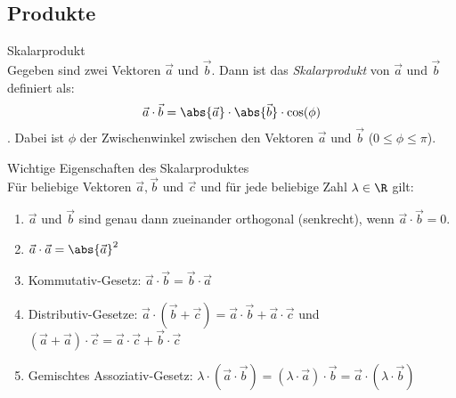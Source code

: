 \subsection{Produkte}
    \begin{definition}{Skalarprodukt}\\
        Gegeben sind zwei Vektoren $\vec{a}$ und $\vec{b}$. 
        Dann ist das \textit{Skalarprodukt} von $\vec{a}$ und $\vec{b}$ definiert als:
        \begin{equation*}
            \vec{a}\cdot\vec{b}=\abs{\vec{a}}\cdot\abs{\vec{b}}\cdot\cos(\phi)
        \end{equation*}. 
        Dabei ist $\phi$ der Zwischenwinkel zwischen den Vektoren $\vec{a}$ und $\vec{b}$ ($0\le\phi\le\pi$).
    \end{definition}

    \begin{theorem}{Wichtige Eigenschaften des Skalarproduktes}\\
        Für beliebige Vektoren $\vec{a}, \vec{b}$ und $\vec{c}$ und für jede beliebige Zahl $\lambda\in\R$ gilt:
        \begin{enumerate}
            \item $\vec{a}$ und $\vec{b}$ sind genau dann zueinander orthogonal (senkrecht), wenn $\vec{a}\cdot\vec{b}=0$.
            \item $\vec{a}\cdot\vec{a}=\abs{\vec{a}}^2$
            \item Kommutativ-Gesetz: $\vec{a}\cdot\vec{b}=\vec{b}\cdot\vec{a}$
            \item Distributiv-Gesetze: $\vec{a}\cdot(\vec{b}+\vec{c})=\vec{a}\cdot\vec{b}+\vec{a}\cdot\vec{c}$ und $(\vec{a}+\vec{a})\cdot\vec{c}=\vec{a}\cdot\vec{c}+\vec{b}\cdot\vec{c}$
            \item Gemischtes Assoziativ-Gesetz: $\lambda\cdot(\vec{a}\cdot\vec{b})=(\lambda\cdot\vec{a})\cdot\vec{b}=\vec{a}\cdot(\lambda\cdot\vec{b})$
        \end{enumerate} 
    \end{theorem}

